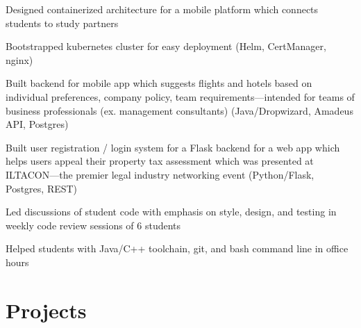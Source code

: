 \documentclass[hidelinks, 11pt]{scrartcl}
\begin{document}
   
{
    \item Designed containerized architecture for a mobile platform which connects 
    students to study partners
    \item Bootstrapped kubernetes cluster for easy deployment (Helm, CertManager, nginx)
}
{
    \item Built backend for mobile app which suggests flights and hotels based on individual preferences,
    company policy, team requirements---intended for teams of business professionals 
    (ex. management consultants) (Java/Dropwizard, Amadeus API, Postgres)
    \item Built user registration / login system for a Flask backend 
    for a web app which helps users appeal their property tax assessment 
    which was presented at ILTACON---the premier legal industry networking event (Python/Flask, Postgres, REST)
}

{
    \item Led discussions of student code with emphasis on style, design, and
        testing in weekly code review sessions of 6 students
    \item Helped students with Java/C++ toolchain, git, and bash command line in
        office hours
}

\section{Projects}
\end{document}
